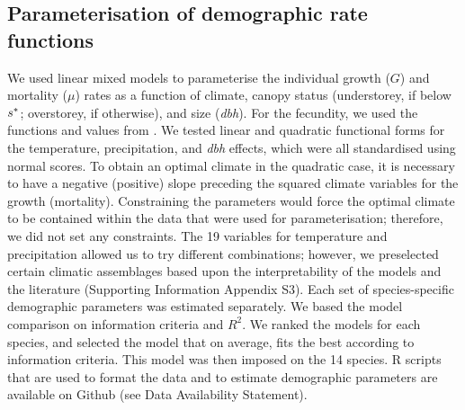\subsection{Parameterisation of demographic rate functions}
We used linear mixed models to parameterise the individual growth ($ G $) and mortality ($ \mu $) rates as a function of climate, canopy status (understorey, if below $ {s}^{*} $; overstorey, if otherwise), and size (\textit{dbh}). For the fecundity, we used the functions and values from \citet{Purves2008}. We tested linear and quadratic functional forms for the temperature, precipitation, and \textit{dbh} effects, which were all standardised using normal scores. To obtain an optimal climate in the quadratic case, it is necessary to have a negative (positive) slope preceding the squared climate variables for the growth (mortality). Constraining the parameters would force the optimal climate to be contained within the data that were used for parameterisation; therefore, we did not set any constraints. The 19 variables for temperature and precipitation allowed us to try different combinations; however, we preselected certain climatic assemblages based upon the interpretability of the models and the literature (Supporting Information Appendix S3). Each set of species-specific demographic parameters was estimated separately. We based the model comparison on information criteria and $ R^2 $. We ranked the models for each species, and selected the model that on average, fits the best according to information criteria. This model was then imposed on the 14 species. R scripts that are used to format the data and to estimate demographic parameters are available on Github (see Data Availability Statement). 

